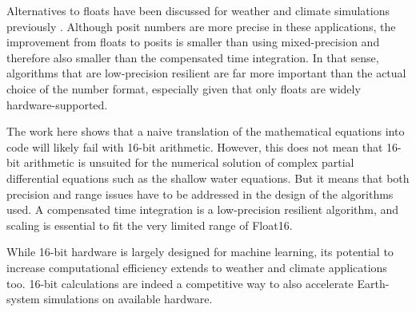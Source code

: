Alternatives to floats have been discussed for weather and climate simulations previously \citep{Klower2019a,Klower2020a}.
Although posit numbers \citep{Gustafson2017a} are more precise in these applications, the improvement from floats to
posits is smaller than using mixed-precision and therefore also smaller than the compensated time integration.
In that sense, algorithms that are low-precision resilient are far more important than the actual choice of the
number format, especially given that only floats are widely hardware-supported.

The work here shows that a naive translation of the mathematical equations into code will likely fail with 16-bit arithmetic.
However, this does not mean that 16-bit arithmetic is unsuited for the numerical solution of complex partial differential
equations such as the shallow water equations. But it means that both precision and range issues have to be addressed
in the design of the algorithms used. A compensated time integration is a low-precision resilient algorithm,
and scaling is essential to fit the very limited range of Float16. 

While 16-bit hardware is largely designed for machine learning, its potential to increase computational efficiency
extends to weather and climate applications too. 16-bit calculations are indeed a competitive way to also accelerate
Earth-system simulations on available hardware.

